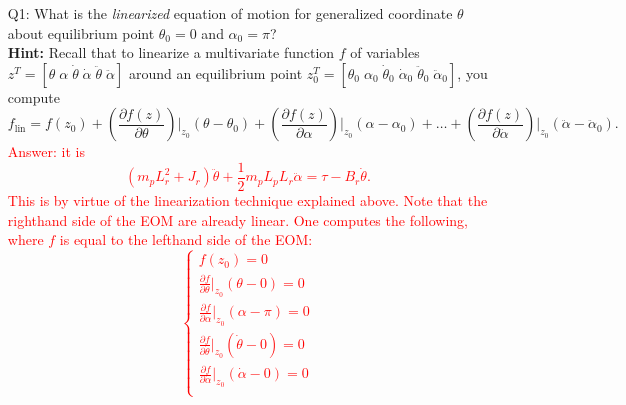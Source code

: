 \documentclass[12pt]{report}
\newcommand\drew[1]{\textcolor{red}{#1}}
\newcommand{\pder}[2]{\frac{\partial #1}{\partial #2}}
\begin{document}
\begin{enumerate}
    \item[Q1:] What is the \emph{linearized} equation of motion for generalized coordinate $\theta$ about equilibrium point $\theta_0 = 0$ and $\alpha_0 = \pi$?\\
          \textbf{Hint:} Recall that to linearize a multivariate function $f$ of variables $z^T = [\theta \; \alpha \; \dot{\theta} \; \dot{\alpha} \; \ddot{\theta} \; \ddot{\alpha}]$ around an equilibrium point $z_{0}^T = [\theta_0 \; \alpha_0 \; \dot{\theta}_0 \; \dot{\alpha}_0 \; \ddot{\theta}_0 \; \ddot{\alpha}_0]$, you compute
          \[
              f_\text{lin} = f(z_0) + \left(\frac{\partial f(z)}{\partial \theta}\right) \bigg|_{z_0}  (\theta - \theta_0) +  \left(\frac{\partial f(z)}{\partial \alpha}\right) \bigg|_{z_0}  (\alpha - \alpha_0) + \dots +  \left(\frac{\partial f(z)}{\partial \ddot{\alpha}}\right) \bigg|_{z_0}  (\ddot{\alpha} - \ddot{\alpha}_0).
          \]
          \drew{Answer: it is
              \[
                  \left(m_p L_{r}^{2} + J_r\right) \ddot{\theta} + \frac{1}{2} m_p L_p L_r \ddot{\alpha} = \tau - B_r \dot{\theta}.
              \]
              This is by virtue of the linearization technique explained above. Note that the righthand side of the EOM are already linear. One computes the following, where $f$ is equal to the lefthand side of the EOM:
              \[
                  \begin{cases}
                      f(z_0) = 0                                                                                                                                                    \\
                      \pder{f}{\theta}\big|_{z_0} (\theta-0) = 0                                                                                                                    \\
                      \pder{f}{\alpha}\big|_{z_0} (\alpha-\pi) = 0                                                                                                                  \\
                      \pder{f}{\dot{\theta}}\big|_{z_0} (\dot{\theta}-0) = 0                                                                                                        \\
                      \pder{f}{\dot{\alpha}}\big|_{z_0} (\dot{\alpha}-0)= 0                                                                                                         \\

\end{cases}\]}
\end{enumerate}
\end{document}
